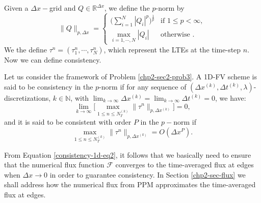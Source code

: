 Given a $\Delta x-$grid and $Q \in \mathbb{R}^{\Delta x}$, we define the $p$-norm by
\begin{equation}
	\label{chp2-pnorm}
	\|Q\|_{p,\Delta x}=
	\begin{cases}
		\bigg( \sum_{i=1}^{N} |Q_i|^p \bigg)^{\frac{1}{p}} & \text{if } 1\leq p < \infty,\\
		\max_{i=1, \cdots, N}{|Q_i|} & \text{otherwise }.
	\end{cases}
\end{equation}
We the define $\tau^n = (\tau_1^n, \cdots, \tau^n_N)$, which represent the LTEs at the time-step $n$.
Now we can define consistency.
\begin{definition}[Consistency]
	\label{chp2-def-cons}
	Let us consider the framework of Problem \ref{chp2-sec2-prob3}.
	A 1D-FV scheme is said to be consistency in the $p$-norm if for any sequence of $(\Delta x^{(k)}, \Delta t^{(k)},\lambda)$-discretizations, 
	$k \in \mathbb{N}$, with $\lim_{k\to \infty }{\Delta x^{(k)}} = \lim_{k\to \infty }{\Delta t^{(k)}} = 0$, we have:
	\begin{equation*}
		\lim_{k \to \infty}\bigg[ {\max_{1\leq n\leq N_T^{(k)}}}{\|\tau^n\|_{p,\Delta x^{(k)}}} \bigg] = 0,
	\end{equation*}
	and it is said to be consistent with order $P$ in the $p-$norm if %
	\begin{equation*}
		{\max_{1\leq n\leq N_T^{(k)}}}{\|\tau^n\|_{p,\Delta x^{(k)}}} = O(\Delta x^P).
	\end{equation*}
\end{definition}
From Equation \eqref{consistency-1d-eq2}, it follows that we basically need to ensure that 
the numerical flux function $\mathcal{F}$ converges to the time-averaged flux at edges
when $\Delta x \to 0$ in order to guarantee consistency.
In Section \ref{chp2-sec-flux} we shall address how the numerical flux from PPM
approximates the time-averaged flux at edges.

